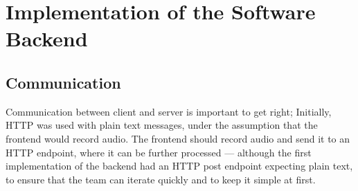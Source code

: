 \cleardoubleemptypage
\renewcommand*\chapterpagestyle{scrheadings}

\chapter{Implementation of the Software Backend}

\section{Communication}
Communication between client and server is important to get right;
Initially, HTTP was used with plain text messages, under the assumption that the frontend would record audio.
The frontend should record audio and send it to an HTTP endpoint, where it can be further processed ---
although the first implementation of the backend had an HTTP post endpoint expecting plain text,
to ensure that the team can iterate quickly and to keep it simple at first.

